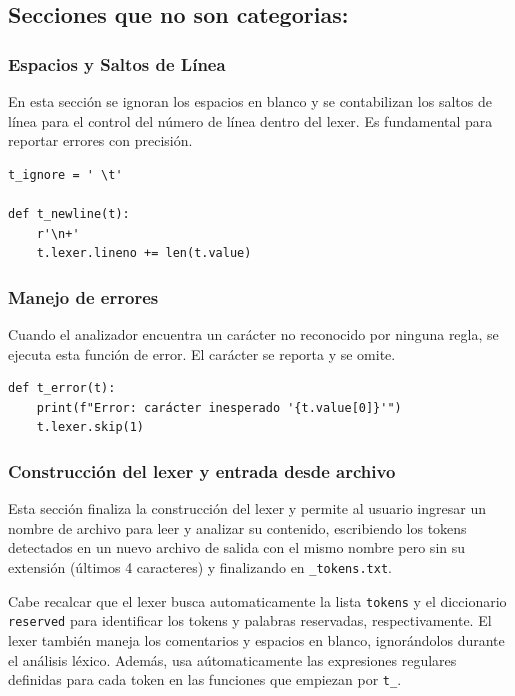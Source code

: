 \documentclass{article}
\begin{document}
\subsection{Secciones que no son categorias:}

\subsubsection{Espacios y Saltos de Línea}

En esta sección se ignoran los espacios en blanco y se contabilizan los saltos de línea para el control del número de línea dentro del lexer. Es fundamental para reportar errores con precisión.

\begin{lstlisting}[style=mypython]
t_ignore = ' \t'

def t_newline(t):
    r'\n+'
    t.lexer.lineno += len(t.value)
\end{lstlisting}

\subsubsection{Manejo de errores}
Cuando el analizador encuentra un carácter no reconocido por ninguna regla, se ejecuta esta función de error. El carácter se reporta y se omite.

\begin{lstlisting}[style=mypython]
def t_error(t):
    print(f"Error: carácter inesperado '{t.value[0]}'")
    t.lexer.skip(1)
\end{lstlisting}

\subsubsection{Construcción del lexer y entrada desde archivo}

Esta sección finaliza la construcción del lexer y permite al usuario ingresar un nombre de archivo para leer y analizar su contenido, escribiendo los tokens detectados en un nuevo archivo de salida con el mismo nombre pero sin su extensión (últimos 4 caracteres) y finalizando en \texttt{\_tokens.txt}.

Cabe recalcar que el lexer busca automaticamente la lista \texttt{tokens} y el diccionario \texttt{reserved} para identificar los tokens y palabras reservadas, respectivamente. El lexer también maneja los comentarios y espacios en blanco, ignorándolos durante el análisis léxico. Además, usa aútomaticamente las expresiones regulares definidas para cada token en las funciones que empiezan por \texttt{t\_}.
\end{document}
